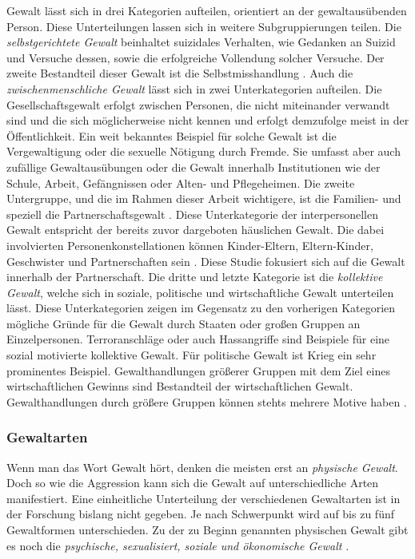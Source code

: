 Gewalt lässt sich in drei Kategorien aufteilen, orientiert an der gewaltausübenden Person. Diese Unterteilungen lassen sich in weitere Subgruppierungen teilen. Die \textit{selbstgerichtete Gewalt} beinhaltet suizidales Verhalten, wie Gedanken an Suizid und Versuche dessen, sowie die erfolgreiche Vollendung solcher Versuche. Der zweite Bestandteil dieser Gewalt ist die Selbstmisshandlung \parencite{Gewaltarten_WHO}. Auch die \textit{zwischenmenschliche Gewalt} lässt sich in zwei Unterkategorien aufteilen. Die Gesellschaftsgewalt erfolgt zwischen Personen, die nicht miteinander verwandt sind und die sich möglicherweise nicht kennen und erfolgt demzufolge meist in der Öffentlichkeit. Ein weit bekanntes Beispiel für solche Gewalt ist die Vergewaltigung oder die sexuelle Nötigung durch Fremde. Sie umfasst aber auch zufällige Gewaltausübungen oder die Gewalt innerhalb Institutionen wie der Schule, Arbeit, Gefängnissen oder Alten- und Pflegeheimen. Die zweite Untergruppe, und die im Rahmen dieser Arbeit wichtigere, ist die Familien- und speziell die Partnerschaftsgewalt \parencite{Gewaltarten_WHO}. Diese Unterkategorie der interpersonellen Gewalt entspricht der bereits zuvor dargeboten häuslichen Gewalt. Die dabei involvierten Personenkonstellationen können Kinder-Eltern, Eltern-Kinder, Geschwister und Partnerschaften sein \parencite{Def_Form_Folge_Gewalt}. Diese Studie fokusiert sich auf die Gewalt innerhalb der Partnerschaft. Die dritte und letzte Kategorie ist die \textit{kollektive Gewalt}, welche sich in soziale, politische und wirtschaftliche Gewalt unterteilen lässt. Diese Unterkategorien zeigen im Gegensatz zu den vorherigen Kategorien mögliche Gründe für die Gewalt durch Staaten oder großen Gruppen an Einzelpersonen. Terroranschläge oder auch Hassangriffe sind Beispiele für eine sozial motivierte kollektive Gewalt. Für politische Gewalt ist Krieg ein sehr prominentes Beispiel. Gewalthandlungen größerer Gruppen mit dem Ziel eines wirtschaftlichen Gewinns sind Bestandteil der wirtschaftlichen Gewalt. Gewalthandlungen durch größere Gruppen können stehts mehrere Motive haben \parencite{Gewaltarten_WHO}.


\subsubsection{Gewaltarten}     \label{2.1.2.1}
Wenn man das Wort Gewalt hört, denken die meisten erst an \textit{physische Gewalt}. Doch so wie die Aggression kann sich die Gewalt auf unterschiedliche Arten manifestiert. Eine einheitliche Unterteilung der verschiedenen Gewaltarten ist in der Forschung bislang nicht gegeben. Je nach Schwerpunkt wird auf bis zu fünf Gewaltformen unterschieden. Zu der zu Beginn genannten physischen Gewalt gibt es noch die \textit{psychische, sexualisiert, soziale und ökonomische Gewalt} \parencite{Def_Form_Folge_Gewalt}.


